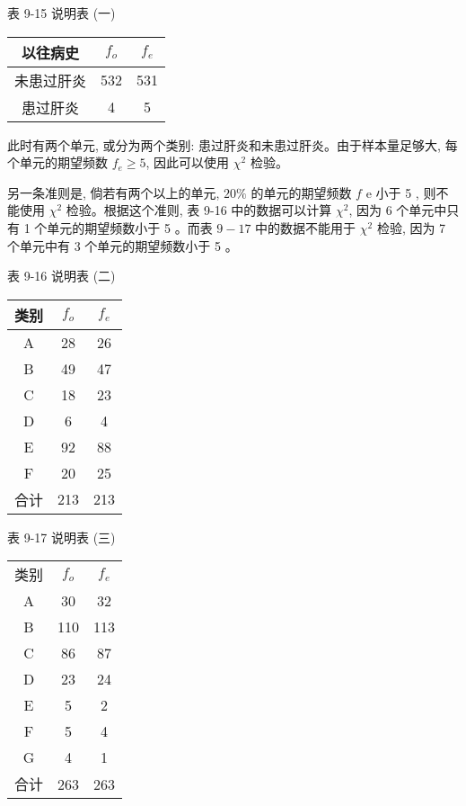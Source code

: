\documentclass[10pt]{article}
\begin{document}
\begin{CJK*}{UTF8}{bsmi}
表 9-15 说明表 (一)

\begin{center}
\begin{tabular}{ccc}
\hline
以往病史 & $f_{o}$ & $f_{e}$ \\
\hline
未患过肝炎 & 532 & 531 \\
患过肝炎 & 4 & 5 \\
\hline
\end{tabular}
\end{center}

此时有两个单元, 或分为两个类别: 患过肝炎和未患过肝炎。由于样本量足够大, 每个单元的期望频数 $f_{e} \geqslant 5$, 因此可以使用 $\chi^{2}$ 检验。

另一条准则是, 倘若有两个以上的单元, $20 \%$ 的单元的期望频数 $f$ e 小于 5 , 则不能使用 $\chi^{2}$ 检验。根据这个准则, 表 9-16 中的数据可以计算 $\chi^{2}$, 因为 6 个单元中只有 1 个单元的期望频数小于 5 。而表 $9-17$ 中的数据不能用于 $\chi^{2}$ 检验, 因为 7 个单元中有 3 个单元的期望频数小于 5 。

表 9-16 说明表 (二)

\begin{center}
\begin{tabular}{ccc}
\hline
类别 & $f_{o}$ & $f_{e}$ \\
\hline
A & 28 & 26 \\
B & 49 & 47 \\
C & 18 & 23 \\
D & 6 & 4 \\
E & 92 & 88 \\
F & 20 & 25 \\
\hline
合计 & 213 & 213 \\
\hline
\end{tabular}
\end{center}

表 9-17 说明表 (三)

\begin{center}
\begin{tabular}{ccc}
\hline
类别 & $f_{o}$ & $f_{e}$ \\
A & 30 & 32 \\
B & 110 & 113 \\
C & 86 & 87 \\
D & 23 & 24 \\
E & 5 & 2 \\
F & 5 & 4 \\
G & 4 & 1 \\
\hline
合计 & 263 & 263 \\
\hline
\end{tabular}
\end{center}


\end{CJK*}
\end{document}
